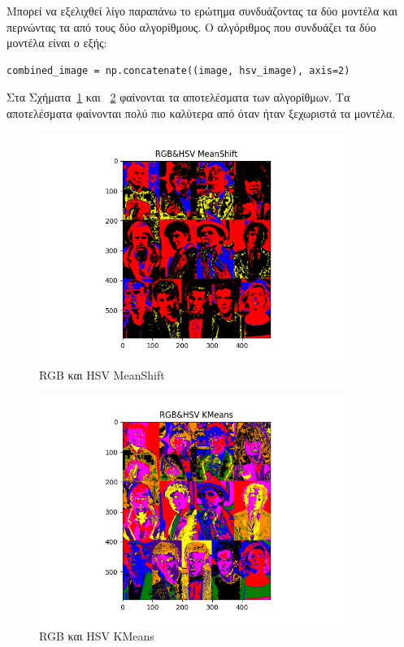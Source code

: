 Μπορεί να εξελιχθεί λίγο παραπάνω το ερώτημα συνδυάζοντας τα δύο μοντέλα και περνώντας τα από τους δύο αλγορίθμους. Ο αλγόριθμος που συνδυάζει τα δύο μοντέλα είναι ο εξής:

\begin{verbatim}
combined_image = np.concatenate((image, hsv_image), axis=2)
\end{verbatim}

Στα Σχήματα~\ref{fig:rgb_hsv_meanshift} και ~\ref{fig:rgb_hsv_kmeans} φαίνονται τα αποτελέσματα των αλγορίθμων. Τα αποτελέσματα φαίνονται πολύ πιο καλύτερα από όταν ήταν ξεχωριστά τα μοντέλα.

\begin{figure}[H]
  \centering
  \includegraphics[width=100mm]{Figures/RGB&HSV_MeanShift}
  \caption{RGB και HSV MeanShift}
  \label{fig:rgb_hsv_meanshift}
\end{figure}

\begin{figure}[H]
  \centering
  \includegraphics[width=100mm]{Figures/RGB&HSV_KMeans}
  \caption{RGB και HSV KMeans}
  \label{fig:rgb_hsv_kmeans}
\end{figure}

